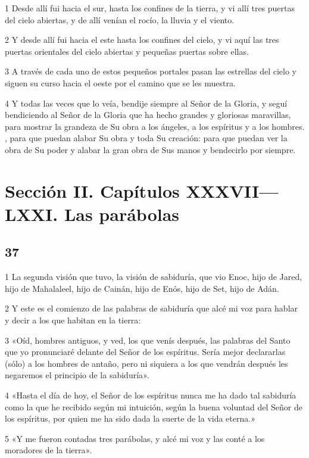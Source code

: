 \par 1 Desde allí fui hacia el sur, hasta los confines de la tierra, y vi allí tres puertas del cielo abiertas, y de allí venían el rocío, la lluvia y el viento.
\par 2 Y desde allí fui hacia el este hasta los confines del cielo, y vi aquí las tres puertas orientales del cielo abiertas y pequeñas puertas sobre ellas.
\par 3 A través de cada uno de estos pequeños portales pasan las estrellas del cielo y siguen su curso hacia el oeste por el camino que se les muestra.
\par 4 Y todas las veces que lo veía, bendije siempre al Señor de la Gloria, y seguí bendiciendo al Señor de la Gloria que ha hecho grandes y gloriosas maravillas, para mostrar la grandeza de Su obra a los ángeles, a los espíritus y a los hombres. , para que puedan alabar Su obra y toda Su creación: para que puedan ver la obra de Su poder y alabar la gran obra de Sus manos y bendecirlo por siempre.

\part{Sección II. Capítulos XXXVII—LXXI. Las parábolas}

\chapter{37}

\par 1 La segunda visión que tuvo, la visión de sabiduría, que vio Enoc, hijo de Jared, hijo de Mahalaleel, hijo de Cainán, hijo de Enós, hijo de Set, hijo de Adán.
\par 2 Y este es el comienzo de las palabras de sabiduría que alcé mi voz para hablar y decir a los que habitan en la tierra:
\par 3 «Oíd, hombres antiguos, y ved, los que venís después, las palabras del Santo que yo pronunciaré delante del Señor de los espíritus. Sería mejor declararlas (sólo) a los hombres de antaño, pero ni siquiera a los que vendrán después les negaremos el principio de la sabiduría».
\par 4 «Hasta el día de hoy, el Señor de los espíritus nunca me ha dado tal sabiduría como la que he recibido según mi intuición, según la buena voluntad del Señor de los espíritus, por quien me ha sido dada la suerte de la vida eterna.»
\par 5 «Y me fueron contadas tres parábolas, y alcé mi voz y las conté a los moradores de la tierra».

